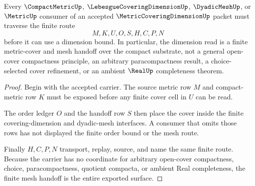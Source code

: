 \begin{theorem}
\label{thm:metric-covering-dimension-finite-mesh-handoff}
Every $\CompactMetricUp$, $\LebesgueCoveringDimensionUp$, $\DyadicMeshUp$, or $\MetricUp$ consumer of an accepted $\MetricCoveringDimensionUp$ packet must traverse the finite route
$$
M,K,U,O,S,H,C,P,N
$$
before it can use a dimension bound. In particular, the dimension read is a finite metric-cover and mesh handoff over the compact substrate, not a general open-cover compactness principle, an arbitrary paracompactness result, a choice-selected cover refinement, or an ambient $\RealUp$ completeness theorem.
\end{theorem}
\begin{proof}
Begin with the accepted carrier. The source metric row $M$ and compact-metric row $K$ must be exposed before any finite cover cell in $U$ can be read.

The order ledger $O$ and the handoff row $S$ then place the cover inside the finite covering-dimension and dyadic-mesh interfaces. A consumer that omits those rows has not displayed the finite order bound or the mesh route.

Finally $H,C,P,N$ transport, replay, source, and name the same finite route. Because the carrier has no coordinate for arbitrary open-cover compactness, choice, paracompactness, quotient compacta, or ambient Real completeness, the finite mesh handoff is the entire exported surface.
\end{proof}




